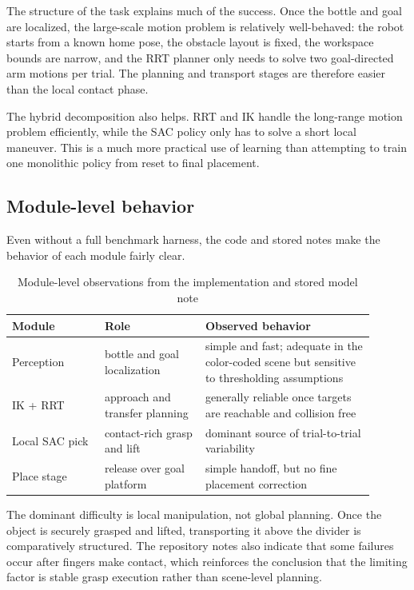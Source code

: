 \documentclass[11pt]{article}
\begin{document}
The structure of the task explains much of the success. Once the bottle and goal are localized, the large-scale motion problem is relatively well-behaved: the robot starts from a known home pose, the obstacle layout is fixed, the workspace bounds are narrow, and the RRT planner only needs to solve two goal-directed arm motions per trial. The planning and transport stages are therefore easier than the local contact phase.

The hybrid decomposition also helps. RRT and IK handle the long-range motion problem efficiently, while the SAC policy only has to solve a short local maneuver. This is a much more practical use of learning than attempting to train one monolithic policy from reset to final placement.

\subsection{Module-level behavior}

Even without a full benchmark harness, the code and stored notes make the behavior of each module fairly clear.

\begin{table}[H]
  \caption{Module-level observations from the implementation and stored model note}
  \label{tab:module-results}
  \centering
  \begin{tabular}{>{\raggedright\arraybackslash}p{0.23\linewidth} >{\raggedright\arraybackslash}p{0.25\linewidth} >{\raggedright\arraybackslash}p{0.42\linewidth}}
    \toprule
    Module & Role & Observed behavior \\
    \midrule
    Perception & bottle and goal localization & simple and fast; adequate in the color-coded scene but sensitive to thresholding assumptions \\
    IK + RRT & approach and transfer planning & generally reliable once targets are reachable and collision free \\
    Local SAC pick & contact-rich grasp and lift & dominant source of trial-to-trial variability \\
    Place stage & release over goal platform & simple handoff, but no fine placement correction \\
    \bottomrule
  \end{tabular}
\end{table}

The dominant difficulty is local manipulation, not global planning. Once the object is securely grasped and lifted, transporting it above the divider is comparatively structured. The repository notes also indicate that some failures occur after fingers make contact, which reinforces the conclusion that the limiting factor is stable grasp execution rather than scene-level planning.
\end{document}
